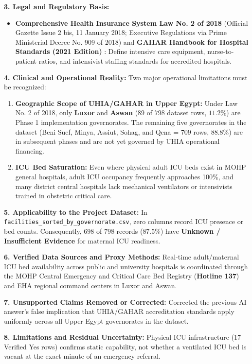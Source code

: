 \documentclass[10pt,a4paper]{article}
\begin{document}
\textbf{3. Legal and Regulatory Basis:}
\begin{itemize}
    \item \textbf{Comprehensive Health Insurance System Law No. 2 of 2018} (Official Gazette Issue 2 bis, 11 January 2018; Executive Regulations via Prime Ministerial Decree No. 909 of 2018) \cite{egypt_law_2_2018_uhia} and \textbf{GAHAR Handbook for Hospital Standards (2021 Edition)} \cite{gahar2021hospital}: Define intensive care equipment, nurse-to-patient ratios, and intensivist staffing standards for accredited hospitals.
\end{itemize}

\textbf{4. Clinical and Operational Reality:}
Two major operational limitations must be recognized:
\begin{enumerate}
    \item \textbf{Geographic Scope of UHIA/GAHAR in Upper Egypt:} Under Law No. 2 of 2018, only \textbf{Luxor} and \textbf{Aswan} ($89$ of $798$ dataset rows, $11.2\%$) are Phase 1 implementation governorates. The remaining five governorates in the dataset (Beni Suef, Minya, Assiut, Sohag, and Qena = $709$ rows, $88.8\%$) are in subsequent phases and are not yet governed by UHIA operational financing.
    \item \textbf{ICU Bed Saturation:} Even where physical adult ICU beds exist in MOHP general hospitals, adult ICU occupancy frequently approaches 100\%, and many district central hospitals lack mechanical ventilators or intensivists trained in obstetric critical care.
\end{enumerate}

\textbf{5. Applicability to the Project Dataset:}
In \texttt{facilities\_sorted\_by\_governorate.csv}, zero columns record ICU presence or bed counts. Consequently, $698$ of $798$ records ($87.5\%$) have \textbf{Unknown / Insufficient Evidence} for maternal ICU readiness.

\textbf{6. Verified Data Sources and Proxy Methods:}
Real-time adult/maternal ICU bed availability across public and university hospitals is coordinated through the MOHP Central Emergency and Critical Care Bed Registry (\textbf{Hotline 137}) and EHA regional command centers in Luxor and Aswan.

\textbf{7. Unsupported Claims Removed or Corrected:}
Corrected the previous AI answer's false implication that UHIA/GAHAR accreditation standards apply uniformly across all Upper Egypt governorates in the dataset.

\textbf{8. Limitations and Residual Uncertainty:}
Physical ICU infrastructure ($17$ Verified Yes rows) confirms static capability, not whether a ventilated ICU bed is vacant at the exact minute of an emergency referral.
\end{document}
